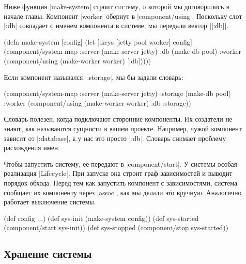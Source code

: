 Ниже функция \spverb|make-system| строит систему, о которой мы договорились в
начале главы. Компонент \spverb|worker| обернут в
\spverb|component/using|. Поскольку слот \spverb|:db| совпадает с именем
компонента в системе, мы передали вектор \spverb|[:db]|.

\begin{english}
  \begin{clojure}
(defn make-system
  [config]
  (let [{:keys [jetty pool worker]} config]
    (component/system-map
     :server (make-server jetty)
     :db     (make-db pool)
     :worker (component/using
              (make-worker worker) [:db]))))
  \end{clojure}
\end{english}

Если компонент назывался \spverb|:storage|, мы бы задали словарь:

\begin{english}
  \begin{clojure}
(component/system-map
 :server  (make-server jetty)
 :storage (make-db pool)
 :worker  (component/using
           (make-worker worker) {:db :storage}))
  \end{clojure}
\end{english}

Словарь полезен, когда подключают сторонние компоненты. Их создатели не знают,
как называются сущности в вашем проекте. Например, чужой компонент зависит от
\spverb|:database|, а у нас это просто \spverb|:db|. Словарь снимает проблему
расхождения имен.

Чтобы запустить систему, ее передают в \spverb|component/start|. У системы
особая реализация \spverb|Lifecycle|. При запуске она строит граф зависимостей и
выводит порядок обхода. Перед тем как запустить компонент с зависимостями,
система сообщает их компоненту через \spverb|assoc|, как мы делали это
вручную. Аналогично работает выключение системы.

\begin{english}
  \begin{clojure}
(def config {...})
(def sys-init (make-system config))
(def sys-started (component/start sys-init))
(def sys-stopped (component/stop sys-started))
  \end{clojure}
\end{english}

\subsection{Хранение системы}

